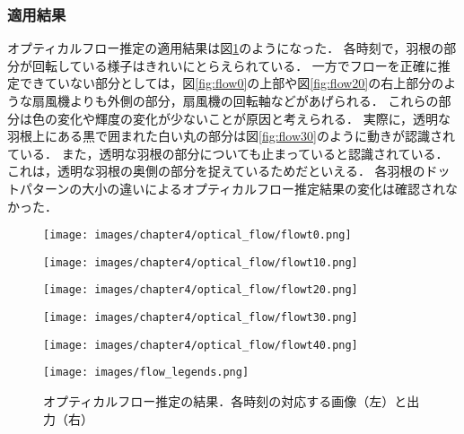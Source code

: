 \subsubsection*{適用結果}
オプティカルフロー推定の適用結果は図\ref{fig:optical_flow_output}のようになった．
各時刻で，羽根の部分が回転している様子はきれいにとらえられている．
一方でフローを正確に推定できていない部分としては，図\ref{fig:flow0}の上部や図\ref{fig:flow20}の右上部分のような扇風機よりも外側の部分，扇風機の回転軸などがあげられる．
これらの部分は色の変化や輝度の変化が少ないことが原因と考えられる．
実際に，透明な羽根上にある黒で囲まれた白い丸の部分は図\ref{fig:flow30}のように動きが認識されている．
また，透明な羽根の部分についても止まっていると認識されている．
これは，透明な羽根の奥側の部分を捉えているためだといえる．
各羽根のドットパターンの大小の違いによるオプティカルフロー推定結果の変化は確認されなかった．

\begin{figure}[H]
	\centering
	\begin{minipage}[t]{0.4\hsize}
		\centering
		\texttt{[image: images/chapter4/optical\_flow/flowt0.png]}
		\label{fig:flow0}
	\end{minipage}
	\begin{minipage}[t]{0.4\hsize}
		\centering
		\texttt{[image: images/chapter4/optical\_flow/flowt10.png]}
		\label{fig:flow10}
	\end{minipage}
	\begin{minipage}[t]{0.4\hsize}
		\centering
		\texttt{[image: images/chapter4/optical\_flow/flowt20.png]}
		\label{fig:flow20}
	\end{minipage}
	\begin{minipage}[t]{0.4\hsize}
		\centering
		\texttt{[image: images/chapter4/optical\_flow/flowt30.png]}
		\label{fig:flow30}
	\end{minipage}
	\begin{minipage}[t]{0.4\hsize}
		\centering
		\texttt{[image: images/chapter4/optical\_flow/flowt40.png]}
		\label{fig:flow40}
	\end{minipage}
	\begin{minipage}[t]{0.4\hsize}
		\centering
		\texttt{[image: images/flow\_legends.png]}
		\label{fig:flow_legends}
	\end{minipage}
	\caption[オプティカルフロー推定の結果]{オプティカルフロー推定の結果．各時刻の対応する画像（左）と出力（右）}
	\label{fig:optical_flow_output}
\end{figure}

